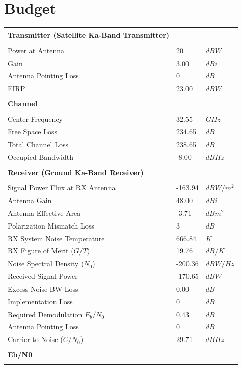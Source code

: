 \documentclass{article}
\begin{document}
\section{Budget}
\label{section::budget}
\begin{center}
  \begin{tabular}{p{3in}p{1in}l}
\textbf{Transmitter (Satellite Ka-Band Transmitter)} & & \\
\hline \\
Power at Antenna & 20 & $dBW$ \\
Gain & 3.00 & $dBi$ \\
Antenna Pointing Loss & 0 & $dB$ \\
EIRP & 23.00 & $dBW$ \\
\\
\textbf{Channel} & & \\
\hline \\
Center Frequency & 32.55 & $GHz$ \\
Free Space Loss & 234.65 & $dB$ \\
Total Channel Loss & 238.65 & $dB$ \\
Occupied Bandwidth & -8.00 & $dBHz$ \\
\\
\textbf{Receiver (Ground Ka-Band Receiver)} & & \\
\hline \\
Signal Power Flux at RX Antenna & -163.94 & $dBW/m^2$ \\
Antenna Gain & 48.00 & $dBi$ \\
Antenna Effective Area & -3.71 & $dBm^2$ \\
Polarization Mismatch Loss & 3 & $dB$ \\
RX System Noise Temperature & 666.84 & $K$ \\
RX Figure of Merit ($G/T$) & 19.76 & $dB/K$ \\
Noise Spectral Density ($N_0$) & -200.36 & $dBW/Hz$ \\
Received Signal Power & -170.65 & $dBW$ \\
Excess Noise BW Loss & 0.00 & $dB$ \\
Implementation Loss & 0 & $dB$ \\
Required Demodulation $E_b/N_0$ & 0.43 & $dB$ \\
Antenna Pointing Loss & 0 & $dB$ \\
Carrier to Noise ($C/N_0$) & 29.71 & $dBHz$ \\
\\
\textbf{Eb/N0} & & \\
\hline \\

\end{tabular}
\end{center}
\end{document}
